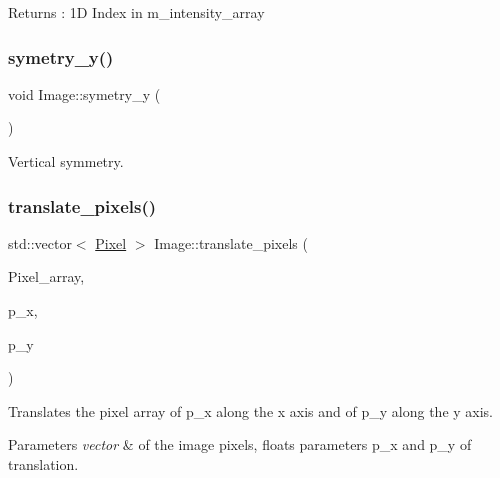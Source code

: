 \begin{DoxyReturn}{Returns}
\+: 1D Index in m\+\_\+intensity\+\_\+array 
\end{DoxyReturn}
\mbox{\label{class_image_ae2c7363e2c5737769fdc72a32339ea94}} 
\subsubsection{\texorpdfstring{symetry\+\_\+y()}{symetry\_y()}}
{\footnotesize\ttfamily void Image\+::symetry\+\_\+y (\begin{DoxyParamCaption}{ }\end{DoxyParamCaption})}



Vertical symmetry. 

\mbox{\label{class_image_ab26f28b1449fbb2f4fd4877df1bdb4d4}} 
\subsubsection{\texorpdfstring{translate\+\_\+pixels()}{translate\_pixels()}}
{\footnotesize\ttfamily std\+::vector$<$ \hyperlink{class_pixel}{Pixel} $>$ Image\+::translate\+\_\+pixels (\begin{DoxyParamCaption}\item[{std\+::vector$<$ \hyperlink{class_pixel}{Pixel} $>$ \&}]{Pixel\+\_\+array,  }\item[{float}]{p\+\_\+x,  }\item[{float}]{p\+\_\+y }\end{DoxyParamCaption})}



Translates the pixel array of p\+\_\+x along the x axis and of p\+\_\+y along the y axis. 


\begin{DoxyParams}{Parameters}
{\em vector} & of the image pixels, floats parameters p\+\_\+x and p\+\_\+y of translation. \\
\hline
\end{DoxyParams}
\mbox{\label{class_image_a3f3a121ab99ee4e67d891316bb802f02}} 
